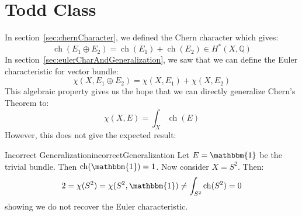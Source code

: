 \documentclass{book}
\newcommand{\Q}{{\mathbb{Q}}}
\newcommand{\ch}{{\operatorname{ch}}}
\begin{document}
\chapter{Todd Class}\label{cha:toddGenus}

In section~\ref{sec:chernCharacter}, we defined the Chern character which gives:
\[
  \ch(E_1\oplus E_2) = \ch(E_1) + \ch(E_2) \in H^*(X, \Q)
\]
In section~\ref{sec:eulerCharAndGeneralization}, we saw that we can define the Euler characteristic for vector
bundle:
\[
  \chi(X, E_1\oplus E_2) = \chi(X, E_1) + \chi(X, E_2)
\]
This algebraic property gives us the hope that we can directly generalize Chern's Theorem to:
\[
  \chi(X, E) = \int_X \ch(E)
\]
However, this does not give the expected result:

\begin{example}{Incorrect Generalization}{incorrectGeneralization}
  Let $E = \mathbbm{1}$ be the trivial bundle. Then $\ch(\mathbbm{1}) = 1$. Now consider $X= S^2$. Then:
  \[
    2 = \chi({S^2}) = \chi({S^2}, \mathbbm{1}) \ne \int_{S^2} \ch(S^2) = 0
  \]
  showing we do not recover the Euler characteristic.
\end{example}
\end{document}
